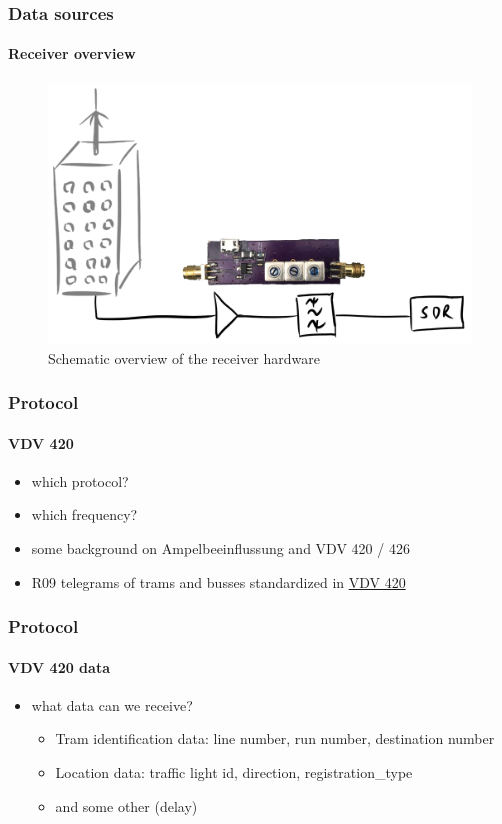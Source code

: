 
\begin{frame}
\frametitle{Data sources}
\framesubtitle{Receiver overview}
\begin{figure}
\centering
\includegraphics[height=0.65\textheight]{figs/antenna-filter.pdf}
\caption{Schematic overview of the receiver hardware}
\end{figure}
\end{frame}


\begin{frame}
\frametitle{Protocol}
\framesubtitle{VDV 420}
	\begin{itemize}
		\item which protocol?
		\item which frequency?
		\item some background on Ampelbeeinflussung and VDV 420 / 426
		\item R09 telegrams of trams and busses standardized in \href{https://knowhow.vdv.de/documents/420/}{VDV 420}
	\end{itemize}
\end{frame}


\begin{frame}
\frametitle{Protocol}
\framesubtitle{VDV 420 data}
\begin{itemize}
	\item what data can we receive?
	\begin{itemize}
		\item Tram identification data: line number, run number, destination number
		\item Location data: traffic light id, direction, registration\_type
		\item and some other (delay)
	\end{itemize}
\end{itemize}
\end{frame}

